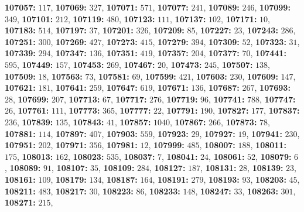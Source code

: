 \textsf{\bfseries 107057:} $117$, \textsf{\bfseries 107069:} $327$, \textsf{\bfseries 107071:} $571$, \textsf{\bfseries 107077:} $241$, \textsf{\bfseries 107089:} $246$, \textsf{\bfseries 107099:} $349$, \textsf{\bfseries 107101:} $212$, \textsf{\bfseries 107119:} $480$, \textsf{\bfseries 107123:} $111$, \textsf{\bfseries 107137:} $102$, \textsf{\bfseries 107171:} $10$, \textsf{\bfseries 107183:} $514$, \textsf{\bfseries 107197:} $37$, \textsf{\bfseries 107201:} $326$, \textsf{\bfseries 107209:} $85$, \textsf{\bfseries 107227:} $23$, \textsf{\bfseries 107243:} $286$, \textsf{\bfseries 107251:} $300$, \textsf{\bfseries 107269:} $427$, \textsf{\bfseries 107273:} $415$, \textsf{\bfseries 107279:} $394$, \textsf{\bfseries 107309:} $52$, \textsf{\bfseries 107323:} $31$, \textsf{\bfseries 107339:} $294$, \textsf{\bfseries 107347:} $136$, \textsf{\bfseries 107351:} $419$, \textsf{\bfseries 107357:} $204$, \textsf{\bfseries 107377:} $70$, \textsf{\bfseries 107441:} $595$, \textsf{\bfseries 107449:} $157$, \textsf{\bfseries 107453:} $269$, \textsf{\bfseries 107467:} $20$, \textsf{\bfseries 107473:} $245$, \textsf{\bfseries 107507:} $138$, \textsf{\bfseries 107509:} $18$, \textsf{\bfseries 107563:} $73$, \textsf{\bfseries 107581:} $69$, \textsf{\bfseries 107599:} $421$, \textsf{\bfseries 107603:} $230$, \textsf{\bfseries 107609:} $147$, \textsf{\bfseries 107621:} $181$, \textsf{\bfseries 107641:} $259$, \textsf{\bfseries 107647:} $619$, \textsf{\bfseries 107671:} $136$, \textsf{\bfseries 107687:} $267$, \textsf{\bfseries 107693:} $28$, \textsf{\bfseries 107699:} $207$, \textsf{\bfseries 107713:} $67$, \textsf{\bfseries 107717:} $276$, \textsf{\bfseries 107719:} $96$, \textsf{\bfseries 107741:} $788$, \textsf{\bfseries 107747:} $26$, \textsf{\bfseries 107761:} $111$, \textsf{\bfseries 107773:} $365$, \textsf{\bfseries 107777:} $22$, \textsf{\bfseries 107791:} $190$, \textsf{\bfseries 107827:} $177$, \textsf{\bfseries 107837:} $236$, \textsf{\bfseries 107839:} $135$, \textsf{\bfseries 107843:} $41$, \textsf{\bfseries 107857:} $1040$, \textsf{\bfseries 107867:} $266$, \textsf{\bfseries 107873:} $78$, \textsf{\bfseries 107881:} $114$, \textsf{\bfseries 107897:} $407$, \textsf{\bfseries 107903:} $559$, \textsf{\bfseries 107923:} $29$, \textsf{\bfseries 107927:} $19$, \textsf{\bfseries 107941:} $230$, \textsf{\bfseries 107951:} $202$, \textsf{\bfseries 107971:} $356$, \textsf{\bfseries 107981:} $12$, \textsf{\bfseries 107999:} $485$, \textsf{\bfseries 108007:} $188$, \textsf{\bfseries 108011:} $175$, \textsf{\bfseries 108013:} $162$, \textsf{\bfseries 108023:} $535$, \textsf{\bfseries 108037:} $7$, \textsf{\bfseries 108041:} $24$, \textsf{\bfseries 108061:} $52$, \textsf{\bfseries 108079:} $6$, \textsf{\bfseries 108089:} $91$, \textsf{\bfseries 108107:} $35$, \textsf{\bfseries 108109:} $284$, \textsf{\bfseries 108127:} $187$, \textsf{\bfseries 108131:} $28$, \textsf{\bfseries 108139:} $23$, \textsf{\bfseries 108161:} $109$, \textsf{\bfseries 108179:} $134$, \textsf{\bfseries 108187:} $164$, \textsf{\bfseries 108191:} $279$, \textsf{\bfseries 108193:} $93$, \textsf{\bfseries 108203:} $45$, \textsf{\bfseries 108211:} $483$, \textsf{\bfseries 108217:} $30$, \textsf{\bfseries 108223:} $86$, \textsf{\bfseries 108233:} $148$, \textsf{\bfseries 108247:} $33$, \textsf{\bfseries 108263:} $301$, \textsf{\bfseries 108271:} $215$, 
